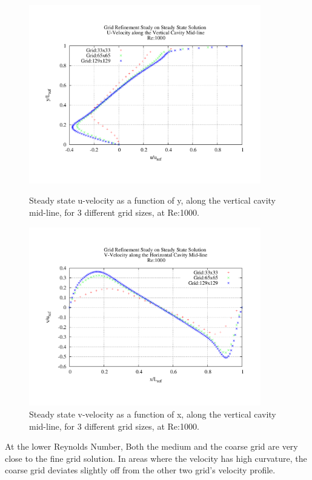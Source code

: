 \begin{figure}[h!]
\center
\includegraphics[width=0.9\textwidth]{plots/grs_u_1000}
\caption{Steady state u-velocity as a function of y, along the vertical cavity mid-line, for 3 different grid sizes, at Re:1000.}
\label{fig:grs_u_1000}

\center
\includegraphics[width=0.9\textwidth]{plots/grs_v_1000}
\caption{Steady state v-velocity as a function of x, along the vertical cavity mid-line, for 3 different grid sizes, at Re:1000.}
\label{fig:grs_v_1000}
\end{figure}

At the lower Reynolds Number, Both the medium and the coarse grid are very close to the fine grid solution.  In areas where the velocity has high curvature, the coarse grid deviates slightly off from the other two grid's velocity profile.  

